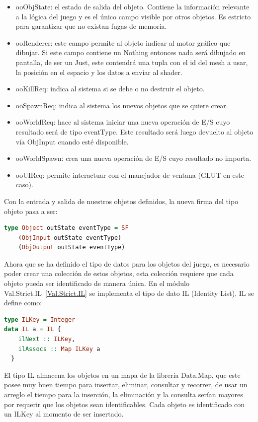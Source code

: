 \begin{itemize}
\item ooObjState: el estado de salida del objeto. Contiene la información relevante a la lógica del juego y es el único campo visible por otros objetos. Es estricto para garantizar que no existan fugas de memoria.
\item ooRenderer: este campo permite al objeto indicar al motor gráfico que dibujar. Si este campo contiene un Nothing entonces nada será dibujado en pantalla, de ser un Just, este contendrá una tupla con el id del mesh a usar, la posición en el espacio y los datos a enviar al shader.
\item ooKillReq: indica al sistema si se debe o no destruir el objeto.
\item ooSpawnReq: indica al sistema los nuevos objetos que se quiere crear.
\item ooWorldReq: hace al sistema iniciar una nueva operación de E/S cuyo resultado será de tipo eventType. Este resultado será luego devuelto al objeto vía ObjInput cuando esté disponible.
\item ooWorldSpawn: crea una nueva operación de E/S cuyo resultado no importa.
\item ooUIReq: permite interactuar con el manejador de ventana (GLUT en este caso).
\end{itemize}

Con la entrada y salida de nuestros objetos definidos, la nueva firma del tipo objeto pasa a ser:

\begin{lstlisting}[label={ObjDef2},frame=single,language=Haskell]
type Object outState eventType = SF
    (ObjInput outState eventType)
    (ObjOutput outState eventType)
\end{lstlisting}

Ahora que se ha definido el tipo de datos para los objetos del juego, es necesario poder crear una colección de estos objetos, esta colección requiere que cada objeto pueda ser identificado de manera única. En el módulo Val.Strict.IL~\ref{Val.Strict.IL} se implementa el tipo de dato IL (Identity List), IL se define como:

\begin{lstlisting}[frame=single,language=Haskell]
type ILKey = Integer
data IL a = IL {
    ilNext :: ILKey,
    ilAssocs :: Map ILKey a
  }
\end{lstlisting}

El tipo IL almacena los objetos en un mapa de la librería Data.Map, que este posee muy buen tiempo para insertar, eliminar, consultar y recorrer, de usar un arreglo el tiempo para la inserción, la eliminación y la consulta serían mayores por requerir que los objetos sean identificables. Cada objeto es identificado con un ILKey al momento de ser insertado.

